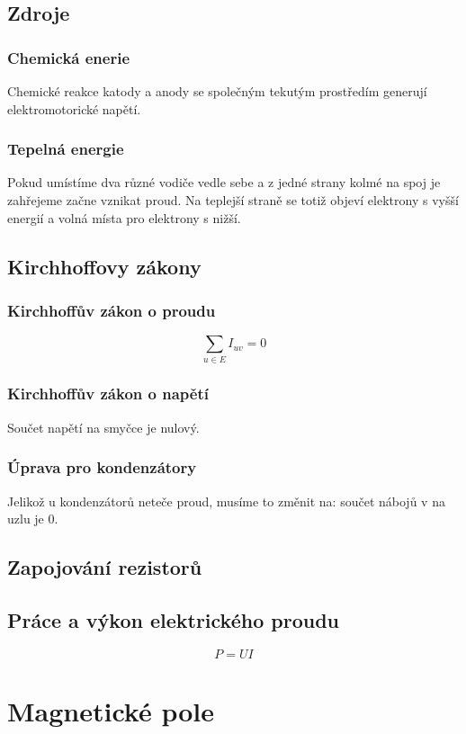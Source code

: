 \documentclass[titlepage]{book}
\begin{document}
\section{Zdroje}
\subsection{Chemická enerie}
Chemické reakce katody a anody se společným tekutým prostředím generují elektromotorické napětí.
\subsection{Tepelná energie}
Pokud umístíme dva různé vodiče vedle sebe a z jedné strany kolmé na spoj je zahřejeme začne vznikat proud. Na teplejší straně se totiž objeví elektrony s vyšší energií a volná místa pro elektrony s nižší.
\section{Kirchhoffovy zákony}
\subsection{Kirchhoffův zákon o proudu}
\begin{equation}\label{eq:random}
\sum_{u \in E} I_{uv} = 0
\end{equation}
\subsection{Kirchhoffův zákon o napětí}
Součet napětí na smyčce je nulový.
\subsection{Úprava pro kondenzátory}
Jelikož u kondenzátorů neteče proud, musíme to změnit na: součet nábojů v na uzlu je 0.
\section{Zapojování rezistorů}
\section{Práce a výkon elektrického proudu}
\begin{equation}
P = UI
\end{equation}
\chapter{Magnetické pole}
\end{document}

